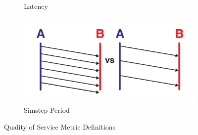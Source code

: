 \begin{figure}
\begin{subfigure}[b]{0.5\textwidth}
    \caption{Latency}
    \label{fig:quality-of-service-metric-definitions-latency}
  \end{subfigure}%
  \begin{subfigure}[b]{0.5\textwidth}
    \centering
    \includegraphics[width=\linewidth]{img/quality-of-service-metric-definitions/simstep-period.pdf}
    \caption{Simstep Period}
    \label{fig:quality-of-service-metric-definitions-simstep-period}
  \end{subfigure}%
  \caption{Quality of Service Metric Definitions}
  \label{fig:quality-of-service-metric-definitions}
\end{figure}
